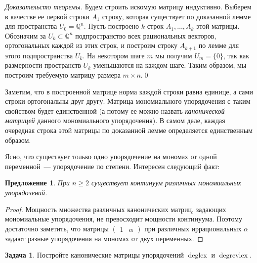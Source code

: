 \documentclass[a4paper,reqno,12pt]{amsart}
\theoremstyle{plain}
\newtheorem{proposition}[theorem]{Предложение}
\theoremstyle{remark}
\theoremstyle{definition}
\newtheorem{problem}{Задача}[section]
\renewcommand{\ge}{\geqslant}
\DeclareMathOperator{\deglex}{deglex}
\DeclareMathOperator{\degrevlex}{degrevlex}
\newcommand{\Q}{\mathbb{Q}}
\begin{document}
{\it Доказательсто теоремы.}
Будем строить искомую матрицу индуктивно.
Выберем в качестве ее первой строки $A_1$ строку, которая существует по доказанной лемме для пространства $U_0 = \Q^n$.
Пусть построено $k$ строк $A_1, \ldots, A_k$ этой матрицы.
Обозначим за $U_k \subset \Q^n$ подпространство всех рациональных векторов, ортогональных каждой из этих строк,
и построим строку $A_{k+1}$ по лемме для этого подпространства $U_k$.
На некотором шаге $m$ мы получим $U_m = \{0\}$, так как размерности пространств $U_k$ уменьшаются на каждом шаге.
Таким образом, мы построим требуемую матрицу размера $m \times n$.\qed


\medskip

Заметим, что в построенной матрице норма каждой строки равна единице, а сами строки ортогональны друг другу.
Матрица мономиального упорядочения с таким свойством будет единственной (а потому ее можно назвать \emph{канонической матрицей} 
данного мономиального упорядочения). В самом деле, каждая очередная строка этой матрицы по доказанной лемме определяется единственным образом.

\bigskip

Ясно, что существует только одно упорядочение на мономах от одной переменной~--- упорядочение по степени.
Интересен следующий факт:
\begin{proposition}
При $n \ge 2$ существует континуум различных мономиальных упорядочений.
\end{proposition}

\begin{proof}
Мощность множества различных канонических матриц, задающих мономиальные упорядочения, не превосходит мощности континуума.
Поэтому достаточно заметить, что матрицы $\begin{pmatrix} 1 & \alpha \end{pmatrix}$
при различных иррациональных $\alpha$ задают разные упорядочения на мономах от двух переменных.
\end{proof}

\begin{problem}
Постройте канонические матрицы упорядочений $\deglex$ и $\degrevlex$.
\end{problem}
\end{document}
